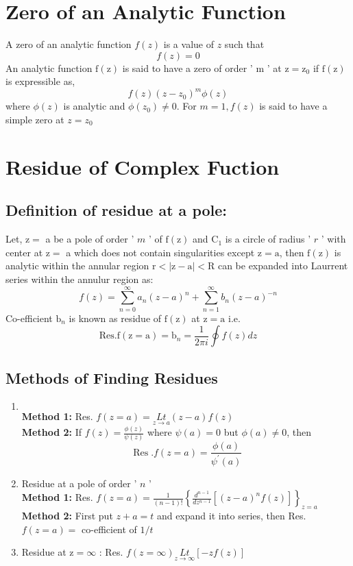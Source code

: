 \section{Zero of an Analytic Function}
A zero of an analytic function $f(z)$ is a value of $z$ such that $$f(z)=0$$
An analytic function $\mathrm{f}(\mathrm{z})$ is said to have a zero of order ' $\mathrm{m}$ ' at $\mathrm{z}=\mathrm{z}_{0}$ if $\mathrm{f}(\mathrm{z})$ is expressible as, $$f(z)\left(z-z_{0}\right)^{m} \phi(z)$$
where $\phi(z)$ is analytic and $\phi\left(z_{0}\right) \neq 0$. For $m=1, f(z)$ is said to have a simple zero at $z=z_{0}$

\section{Residue of Complex Fuction}
\subsection{Definition of residue at a pole:}
Let, $\mathrm{z}=$ a be a pole of order ' $m$ ' of $\mathrm{f}(\mathrm{z})$ and $\mathrm{C}_{1}$ is a circle of radius ' $r$ ' with center at $\mathrm{z}=$ a which does not contain singularities except $\mathrm{z}=\mathrm{a}$, then $\mathrm{f}(\mathrm{z})$ is analytic within the annular region $\mathrm{r}<|\mathrm{z}-\mathrm{a}|<\mathrm{R}$ can be expanded into Laurrent series within the annulur region as:
$$f(z)=\sum_{n=0}^{\infty} a_{n}(z-a)^{n}+\sum_{n=1}^{\infty} b_{n}(z-a)^{-n}$$
Co-efficient $\mathrm{b}_{n}$ is known as residue of $\mathrm{f}(\mathrm{z})$ at $\mathrm{z}=\mathrm{a}$ i.e.
\begin{equation}
\text{Res.} \mathrm{f}(\mathrm{z}=\mathrm{a})=\mathrm{b}_{n}=\frac{1}{2 \pi i} \oint f(z) d z
\end{equation} 
\subsection{Methods of Finding Residues}
\begin{enumerate}[label=(\alph*)]
	\item $\left. \right. $\\
	\textbf{Method 1:}  Res. $f(z=a)=\underset{z \rightarrow a}{L t}(z-a) f(z)$\\
	\textbf{Method 2: }If $f(z)=\frac{\phi(z)}{\psi(z)}$ where $\psi(a)=0$ but $\phi(a) \neq 0$, then $$\operatorname{Res} . f(z=a)=\frac{\phi(a)}{\psi^{\prime}(a)}$$
	\item Residue at a pole of order ' $n$ '\\
	\textbf{Method 1:} Res. $f(z=a)=\frac{1}{(n-1) !}\left\{\frac{d^{n-1}}{d z^{n-1}}\left[(z-a)^{n} f(z)\right]\right\}_{z=a}$\\
	\textbf{Method 2:} First put $z+a=t$ and expand it into series, then Res. $f(z=a)=$ co-efficient of $1 / t$
	\item Residue at $\mathrm{z}=\infty$ : Res. $f(z=\infty) \underset{z \rightarrow \infty}{L t}[-z f(z)]$
\end{enumerate}



